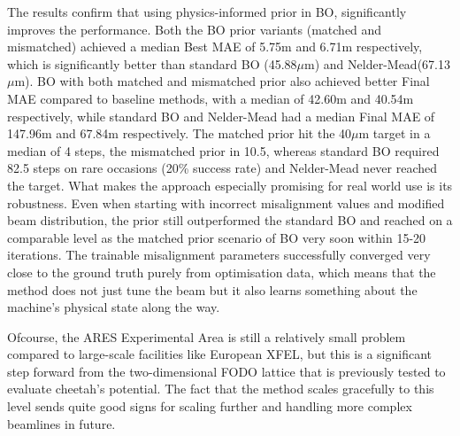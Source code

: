 The results confirm that using physics-informed prior in BO, significantly improves the performance. Both the BO prior variants (matched and mismatched) achieved a median Best MAE of \SI{5.75}{\mu}m and \SI{6.71}{\mu}m respectively, which is significantly better than standard BO (45.88$\mu$m) and Nelder-Mead(67.13$\mu$m).
BO with both matched and mismatched prior also achieved better Final MAE compared to baseline methods, with a median of \SI{42.60}{\mu}m and \SI{40.54}{\mu}m respectively, while standard BO and Nelder-Mead had a median Final MAE of \SI{147.96}{\mu}m and \SI{67.84}{\mu}m respectively.
The matched prior hit the 40$\mu$m target in a median of 4 steps, the mismatched prior in 10.5, whereas standard BO required 82.5 steps on rare occasions (20\% success rate) and 
Nelder-Mead never reached the target. What makes the approach especially promising for real world use is its robustness. Even when starting with incorrect misalignment values 
and modified beam distribution, the prior still outperformed the standard BO and reached on a comparable level as the matched prior scenario 
of BO very soon within 15-20 iterations. The trainable misalignment parameters successfully converged very close to the ground truth purely from optimisation data, which means that the method does 
not just tune the beam but it also learns something about the machine's physical state along the way.  \

Ofcourse, the ARES Experimental Area is still a relatively small problem compared to large-scale facilities like European XFEL, 
but this is a significant step forward from the two-dimensional FODO lattice that is previously tested to evaluate cheetah's potential. The fact that the method scales gracefully 
to this level sends quite good signs for scaling further and handling more complex beamlines in future. 



